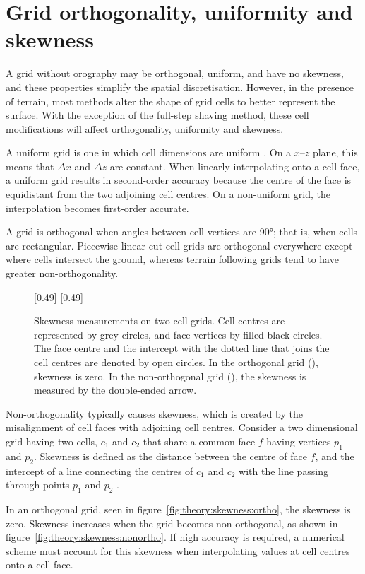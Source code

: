 \section{Grid orthogonality, uniformity and skewness}
\label{sec:theory:skewness}

A grid without orography may be orthogonal, uniform, and have no skewness, and these properties simplify the spatial discretisation.  However, in the presence of terrain, most methods alter the shape of grid cells to better represent the surface.  With the exception of the full-step shaving method, these cell modifications will affect orthogonality, uniformity and skewness.

A uniform grid is one in which cell dimensions are uniform \autocite{leveque2002}.  On a $x$--$z$ plane, this means that $\Delta x$ and $\Delta z$ are constant.  When linearly interpolating onto a cell face, a uniform grid results in second-order accuracy because the centre of the face is equidistant from the two adjoining cell centres.  On a non-uniform grid, the interpolation becomes first-order accurate.

A grid is orthogonal when angles between cell vertices are \ang{90}; that is, when cells are rectangular.  Piecewise linear cut cell grids are orthogonal everywhere except where cells intersect the ground, whereas terrain following grids tend to have greater non-orthogonality.

\begin{figure}
	\captionsetup[subfigure]{position=b}
	\centering
	[0.49\textwidth]{\vspace{1em}}
	\hfill
	[0.49\textwidth]{}
%
	\caption{Skewness measurements on two-cell grids.  Cell centres are represented by grey circles, and face vertices by filled black circles.  The face centre and the intercept with the dotted line that joins the cell centres are denoted by open circles.  In the orthogonal grid (), skewness is zero.  In the non-orthogonal grid (), the skewness is measured by the double-ended arrow.}
	\label{fig:theory:skewness}
\end{figure}

Non-orthogonality typically causes skewness, which is created by the misalignment of cell faces with adjoining cell centres.
Consider a two dimensional grid having two cells, $c_1$ and $c_2$ that share a common face $f$ having vertices $p_1$ and $p_2$.  Skewness is defined as the distance between the centre of face $f$, and the intercept of a line connecting the centres of $c_1$ and $c_2$ with the line passing through points $p_1$ and $p_2$ \autocite{moraes2013}.

In an orthogonal grid, seen in figure~\ref{fig:theory:skewness:ortho}, the skewness is zero.  Skewness increases when the grid becomes non-orthogonal, as shown in figure~\ref{fig:theory:skewness:nonortho}.  If high accuracy is required, a numerical scheme must account for this skewness when interpolating values at cell centres onto a cell face.
